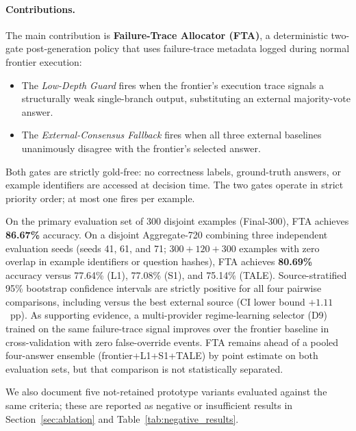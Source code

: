 \paragraph{Contributions.}
The main contribution is \textbf{Failure-Trace Allocator (FTA)}, a deterministic
two-gate post-generation policy that uses failure-trace metadata logged during normal
frontier execution:
\begin{itemize}[leftmargin=1.4em,itemsep=2pt]
  \item The \textit{Low-Depth Guard} fires when the frontier's execution trace signals
        a structurally weak single-branch output, substituting an external majority-vote
        answer.
  \item The \textit{External-Consensus Fallback} fires when all three external baselines
        unanimously disagree with the frontier's selected answer.
\end{itemize}
Both gates are strictly gold-free: no correctness labels, ground-truth answers, or
example identifiers are accessed at decision time.
The two gates operate in strict priority order; at most one fires per example.

On the primary evaluation set of 300 disjoint examples (Final-300), FTA achieves
\textbf{86.67\%} accuracy.
On a disjoint Aggregate-720 combining three independent evaluation seeds (seeds 41,
61, and 71; $300 + 120 + 300$ examples with zero overlap in example identifiers or
question hashes), FTA achieves \textbf{80.69\%} accuracy versus 77.64\% (L1),
77.08\% (S1), and 75.14\% (TALE).
Source-stratified 95\% bootstrap confidence intervals are strictly positive for all
four pairwise comparisons, including versus the best external source
(CI lower bound $+1.11$~pp).
As supporting evidence, a multi-provider regime-learning selector (D9) trained on the
same failure-trace signal improves over the frontier baseline in cross-validation with zero
false-override events.
FTA remains ahead of a pooled four-answer ensemble (frontier+L1+S1+TALE) by point
estimate on both evaluation sets, but that comparison is not statistically separated.

We also document five not-retained prototype variants evaluated against the same
criteria; these are reported as negative or insufficient results in
Section~\ref{sec:ablation} and Table~\ref{tab:negative_results}.

